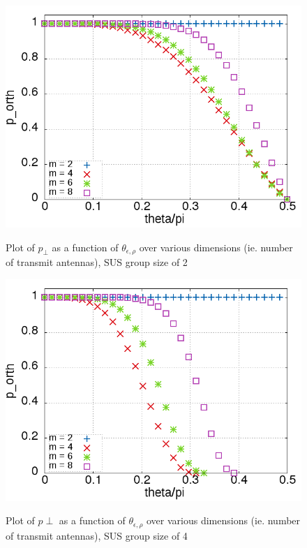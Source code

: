 \begin{figure}
    \includegraphics[width=12cm]{figs/p_orth_gs_2.png}\\
    \caption{Plot of $p_{\perp}$ as a function of $\theta_{\epsilon,\rho}$ over various dimensions (ie. number of transmit antennas), SUS group size of 2}
    \label{fig:p_orth_gs_2}
\end{figure}

\begin{figure}
    \includegraphics[width=12cm]{figs/p_orth_gs_4.png}\\
    \caption{Plot of $p{\perp}$ as a function of $\theta_{\epsilon,\rho}$ over various dimensions (ie. number of transmit antennas), SUS group size of 4}
    \label{fig:p_orth_gs_4}
\end{figure}

